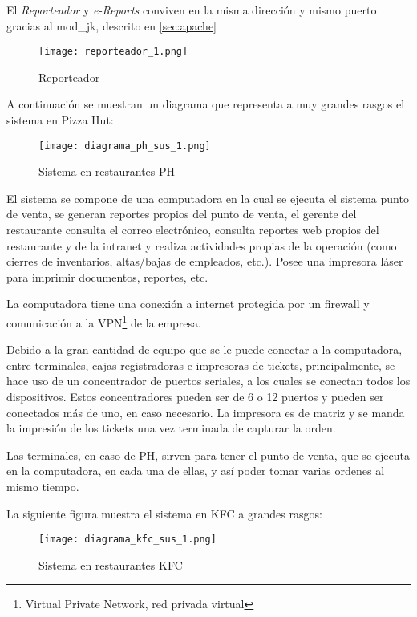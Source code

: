 El \textit{Reporteador} y \textit{e-Reports} conviven en la misma dirección y mismo puerto gracias al mod\_jk, descrito en \ref{sec:apache}

\begin{figure}[htb]
 \begin{center}
  \texttt{[image: reporteador\_1.png]}
 \end{center}
 \caption{Reporteador}
 \label{fig:reporteador}
\end{figure}

A continuación se muestran un diagrama que representa a muy grandes rasgos el sistema en Pizza Hut:

\begin{figure}[htb]
 \begin{center}
  \texttt{[image: diagrama\_ph\_sus\_1.png]}
 \end{center}
 \caption{Sistema en restaurantes PH}
 \label{fig:sist_rest_ph}
\end{figure}

El sistema se compone de una computadora en la cual se ejecuta el sistema punto de venta, se generan reportes propios del punto de venta, el gerente del restaurante consulta el correo electrónico, consulta reportes web propios del restaurante y de la intranet y realiza actividades propias de la operación (como cierres de inventarios, altas/bajas de empleados, etc.). Posee una impresora láser para imprimir documentos, reportes, etc.

La computadora tiene una conexión a internet protegida por un firewall y comunicación a la VPN\footnote{Virtual Private Network, red privada virtual} de la empresa.

Debido a la gran cantidad de equipo que se le puede conectar a la computadora, entre terminales, cajas registradoras e impresoras de tickets, principalmente, se hace uso de un concentrador de puertos seriales, a los cuales se conectan todos los dispositivos. Estos concentradores pueden ser de 6 o 12 puertos y pueden ser conectados más de uno, en caso necesario. La impresora es de matriz y se manda la impresión de los tickets una vez terminada de capturar la orden.

Las terminales, en caso de PH, sirven para tener el punto de venta, que se ejecuta en la computadora, en cada una de ellas, y así poder tomar varias ordenes al mismo tiempo.


La siguiente figura muestra el sistema en KFC a grandes rasgos:

\begin{figure}[htb]
 \begin{center}
  \texttt{[image: diagrama\_kfc\_sus\_1.png]}
 \end{center}
 \caption{Sistema en restaurantes KFC}
 \label{fig:sist_rest_kfc}
\end{figure}

